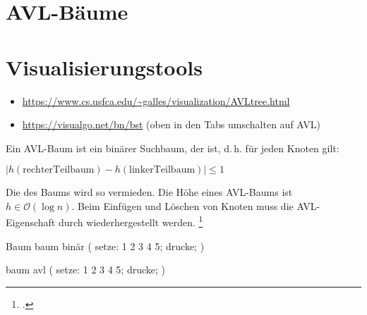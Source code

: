 \documentclass{lehramt-informatik-haupt}
\begin{document}

\section{AVL-Bäume}

\begin{quellen}
\item \cite{wiki:avl-baum}
\item \cite[Kapitel 14.4.2, Seite 378-386 (PDF 394-402)]{saake}
\item \cite[bst]{net:html:visualgo}
\end{quellen}

%

\section{Visualisierungstools}

\begin{itemize}
\item \url{https://www.cs.usfca.edu/~galles/visualization/AVLtree.html}
\item \url{https://visualgo.net/bn/bst} (oben in den Tabs umschalten auf AVL)
\end{itemize}

\noindent
Ein AVL-Baum ist ein binärer Suchbaum, der  ist,
d.\,h. für jeden Knoten gilt:

\begin{center}
$|h(\text{rechterTeilbaum}) - h(\text{linkerTeilbaum})| \leq 1$
\end{center}

\noindent
Die  des Baums wird so vermieden. Die Höhe eines
AVL-Baums ist $h \in \mathcal{O}(\log n)$. Beim Einfügen und Löschen von
Knoten muss die AVL-Eigenschaft durch 
wiederhergestellt werden.
\footcite[Seite 22 (PDF 16)]{aud:fs:5}

\begin{liProjektSprache}{Baum}
baum binär (
  setze: 1 2 3 4 5;
  drucke;
)

baum avl (
  setze: 1 2 3 4 5;
  drucke;
)
\end{liProjektSprache}
\end{document}
